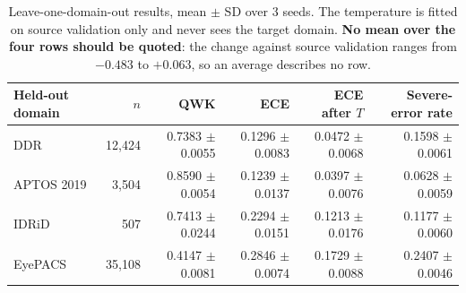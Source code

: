 \begin{table}[t]
\centering
\caption{Leave-one-domain-out results, mean $\pm$ SD over 3 seeds. The temperature is fitted on source validation only and never sees the target domain. \textbf{No mean over the four rows should be quoted}: the change against source validation ranges from $-0.483$ to $+0.063$, so an average describes no row.}
\label{tab:lodo}
\begin{tabular}{lrrrrr}
\toprule
Held-out domain & $n$ & QWK & ECE & ECE after $T$ & Severe-error rate \\
\midrule
DDR & 12,424 & 0.7383 $\pm$ 0.0055 & 0.1296 $\pm$ 0.0083 & 0.0472 $\pm$ 0.0068 & 0.1598 $\pm$ 0.0061 \\
APTOS 2019 & 3,504 & 0.8590 $\pm$ 0.0054 & 0.1239 $\pm$ 0.0137 & 0.0397 $\pm$ 0.0076 & 0.0628 $\pm$ 0.0059 \\
IDRiD & 507 & 0.7413 $\pm$ 0.0244 & 0.2294 $\pm$ 0.0151 & 0.1213 $\pm$ 0.0176 & 0.1177 $\pm$ 0.0060 \\
EyePACS & 35,108 & 0.4147 $\pm$ 0.0081 & 0.2846 $\pm$ 0.0074 & 0.1729 $\pm$ 0.0088 & 0.2407 $\pm$ 0.0046 \\
\bottomrule
\end{tabular}
\end{table}